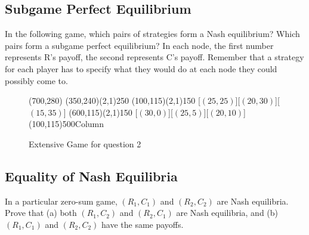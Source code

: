 \subsection{Subgame Perfect Equilibrium}
In the following game, which pairs of strategies form a Nash equilibrium? Which pairs form a subgame perfect equilibrium? In each node, the first number represents R's payoff, the second represents C's payoff. Remember that a strategy for each player has to specify what they would do at each node they could possibly come to.
\begin{figure}[htb] 
\hspace*{\fill} 
\begin{egame}(700,280) 
% 
\putbranch(350,240)(2,1){250}
% 
% 
\putbranch(100,115)(2,1){150} 
% 
[$(25, 25)$][$(20, 30)$][$(15, 35)$] 
% 
\putbranch(600,115)(2,1){150} 
% 
[$(30, 0)$][$(25, 5)$][$(20, 10)$]
% 
\infoset(100,115){500}{Column} 
% 
\end{egame} 
\hspace*{\fill} 
\caption[]{Extensive Game for question 2}
\label{f:one} 
\end{figure} 
\subsection{Equality of Nash Equilibria}
In a particular zero-sum game, $(R_1, C_1)$ and $(R_2, C_2)$ are Nash equilibria. Prove that (a) both $(R_1, C_2)$ and $(R_2, C_1)$ are Nash equilibria, and (b) $(R_1, C_1)$ and $(R_2, C_2)$ have the same payoffs.



